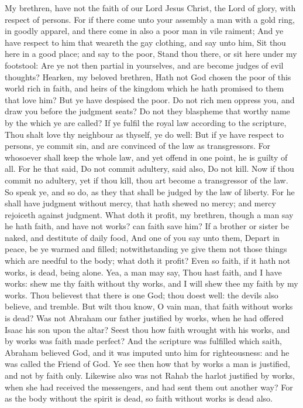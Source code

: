  My brethren, have not the faith of our Lord Jesus Christ,
the Lord of glory, with respect of persons.  For if there
come unto your assembly a man with a gold ring, in goodly apparel, and
there come in also a poor man in vile raiment;  And ye have
respect to him that weareth the gay clothing, and say unto him, Sit thou
here in a good place; and say to the poor, Stand thou there, or sit here
under my footstool:  Are ye not then partial in yourselves,
and are become judges of evil thoughts?  Hearken, my beloved
brethren, Hath not God chosen the poor of this world rich in faith, and
heirs of the kingdom which he hath promised to them that love him?
 But ye have despised the poor. Do not rich men oppress you,
and draw you before the judgment seats?  Do not they
blaspheme that worthy name by the which ye are called?  If
ye fulfil the royal law according to the scripture, Thou shalt love thy
neighbour as thyself, ye do well:  But if ye have respect to
persons, ye commit sin, and are convinced of the law as transgressors.
 For whosoever shall keep the whole law, and yet offend in
one point, he is guilty of all.  For he that said, Do not
commit adultery, said also, Do not kill. Now if thou commit no adultery,
yet if thou kill, thou art become a transgressor of the law.
 So speak ye, and so do, as they that shall be judged by
the law of liberty.  For he shall have judgment without
mercy, that hath shewed no mercy; and mercy rejoiceth against judgment.
 What doth it profit, my brethren, though a man say he hath
faith, and have not works? can faith save him?  If a
brother or sister be naked, and destitute of daily food, 
And one of you say unto them, Depart in peace, be ye warmed and filled;
notwithstanding ye give them not those things which are needful to the
body; what doth it profit?  Even so faith, if it hath not
works, is dead, being alone.  Yea, a man may say, Thou hast
faith, and I have works: shew me thy faith without thy works, and I will
shew thee my faith by my works.  Thou believest that there
is one God; thou doest well: the devils also believe, and tremble.
 But wilt thou know, O vain man, that faith without works
is dead?  Was not Abraham our father justified by works,
when he had offered Isaac his son upon the altar?  Seest
thou how faith wrought with his works, and by works was faith made
perfect?  And the scripture was fulfilled which saith,
Abraham believed God, and it was imputed unto him for righteousness: and
he was called the Friend of God.  Ye see then how that by
works a man is justified, and not by faith only.  Likewise
also was not Rahab the harlot justified by works, when she had received
the messengers, and had sent them out another way?  For as
the body without the spirit is dead, so faith without works is dead
also.

